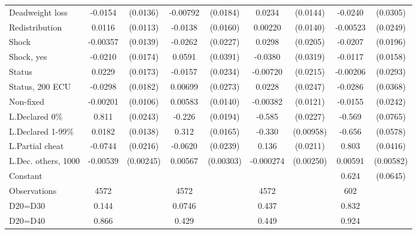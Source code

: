 \begin{tabular}{l|cccccc|cc}
Deadweight loss&  -0.0154         & (0.0136)& -0.00792         & (0.0184)&   0.0234         & (0.0144)&  -0.0240         & (0.0305)\\
Redistribution&   0.0116         & (0.0113)&  -0.0138         & (0.0160)&  0.00220         & (0.0140)& -0.00523         & (0.0249)\\
Shock         & -0.00357         & (0.0139)&  -0.0262         & (0.0227)&   0.0298         & (0.0205)&  -0.0207         & (0.0196)\\
Shock, yes    &  -0.0210         & (0.0174)&   0.0591         & (0.0391)&  -0.0380         & (0.0319)&  -0.0117         & (0.0158)\\
Status        &   0.0229         & (0.0173)&  -0.0157         & (0.0234)& -0.00720         & (0.0215)& -0.00206         & (0.0293)\\
Status, 200 ECU&  -0.0298         & (0.0182)&  0.00699         & (0.0273)&   0.0228         & (0.0247)&  -0.0286         & (0.0368)\\
Non-fixed     & -0.00201         & (0.0106)&  0.00583         & (0.0140)& -0.00382         & (0.0121)&  -0.0155         & (0.0242)\\
L.Declared 0\%&    0.811\sym{***}& (0.0243)&   -0.226\sym{***}& (0.0194)&   -0.585\sym{***}& (0.0227)&   -0.569\sym{***}& (0.0765)\\
L.Declared 1-99\%&   0.0182         & (0.0138)&    0.312\sym{***}& (0.0165)&   -0.330\sym{***}&(0.00958)&   -0.656\sym{***}& (0.0578)\\
L.Partial cheat &  -0.0744\sym{***}& (0.0216)&  -0.0620\sym{***}& (0.0239)&    0.136\sym{***}& (0.0211)&    0.803\sym{***}& (0.0416)\\
L.Dec. others, 1000& -0.00539\sym{**} &(0.00245)&  0.00567\sym{*}  &(0.00303)&-0.000274         &(0.00250)&  0.00591         &(0.00582)\\
Constant        &                  &         &                  &         &                  &         &    0.624\sym{***}& (0.0645)\\
\hline
Observations    &     4572         &         &     4572         &         &     4572         &         &      602         &         \\
D20=D30         &    0.144         &         &   0.0746         &         &    0.437         &         &    0.832         &         \\
D20=D40         &    0.866         &         &    0.429         &         &    0.449         &         &    0.924         &         \\

\end{tabular}
